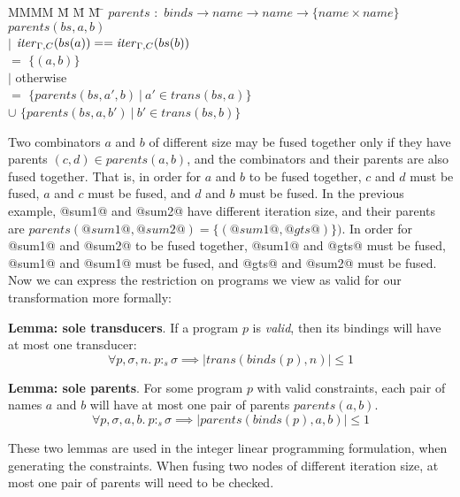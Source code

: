 \begin{tabbing}
MMMM \= M \= M \= M \= \kill
$parents$ \> $:$ \> $binds \to name \to name \to \{name \times name\}$ \\
$parents(bs, a, b)$ \\
        \> $|$ \> $\mathit{iter}_{\Gamma,C}(bs(a)) == \mathit{iter}_{\Gamma,C}(bs(b))$ \\
        \>     \>                      \> $=$ \> $\{(a, b)\}$ \\
        \> $|$ \> otherwise            \\
        \>     \>                      \> $=$    \> $\{ parents(bs, a', b) ~|~ a' \in trans(bs, a) \} $      \\
        \>     \>                      \> $\cup$ \> $\{ parents(bs, a, b') ~|~ b' \in trans(bs, b) \} $  \\
\end{tabbing}

Two combinators $a$ and $b$ of different size may be fused together only if they have parents $(c, d) \in parents(a,b)$, and the combinators and their parents are also fused together.
That is, in order for $a$ and $b$ to be fused together, $c$ and $d$ must be fused, $a$ and $c$ must be fused, and $d$ and $b$ must be fused.
In the previous example, @sum1@ and @sum2@ have different iteration size, and their parents are $parents(@sum1@, @sum2@) = \{(@sum1@, @gts@)\})$.
In order for @sum1@ and @sum2@ to be fused together, @sum1@ and @gts@ must be fused, @sum1@ and @sum1@ must be fused, and @gts@ and @sum2@ must be fused. Now we can express the restriction on programs we view as valid for our transformation more formally:

\textbf{Lemma: sole transducers}.
If a program $p$ is \emph{valid}, then its bindings will have at most one transducer:
\[
\forall p, \sigma, n.\ p :_s \sigma \implies |trans(binds(p), n)| \le 1
\]
 
\textbf{Lemma: sole parents}.
For some program $p$ with valid constraints, each pair of names $a$ and $b$ will have at most one pair of parents $parents(a,b)$.
\[
\forall p, \sigma, a, b.\ p :_s \sigma \implies |parents(binds(p), a, b)| \le 1
\]

These two lemmas are used in the integer linear programming formulation, when generating the constraints.
When fusing two nodes of different iteration size, at most one pair of parents will need to be checked.

